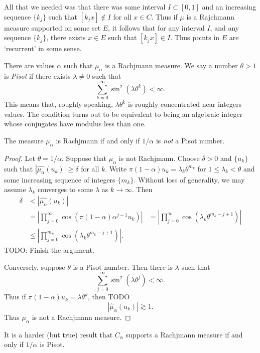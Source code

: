 All that we needed was that there was some interval $I \subset [0,1]$ and an increasing sequence $\{ k_j \}$ such that $[k_j x] \not \in I$ for all $x \in C$. Thus if $\mu$ is a Rajchmann measure supported on some set $E$, it follows that for any interval $I$, and any sequence $\{ k_j \}$, there exists $x \in E$ such that $[k_j x] \in I$. Thus points in $E$ are `recurrent' in some sense.

There are values $\alpha$ such that $\mu_\alpha$ is a Rachjmann measure. We say a number $\theta > 1$ is \emph{Pisot} if there exists $\lambda \neq 0$ such that
%
\[ \sum_{k = 0}^\infty \sin^2(\lambda \theta^k) < \infty. \]
%
This means that, roughly speaking, $\lambda \theta^k$ is roughly concentrated near integers values. The condition turns out to be equivalent to being an algebraic integer whose conjugates have modulus less than one.

\begin{theorem}
  The measure $\mu_\alpha$ is Rachjmann if and only if $1/\alpha$ is \emph{not} a Pisot number.
\end{theorem}
\begin{proof}
  Let $\theta = 1/\alpha$. Suppose that $\mu_\alpha$ is not Rachjmann. Choose $\delta > 0$ and $\{ u_k \}$ such that $|\widehat{\mu_\alpha}(u_k)| \geq \delta$ for all $k$. Write $\pi (1 - \alpha) u_k = \lambda_k \theta^{m_k}$ for $1 \leq \lambda_k < \theta$ and some increasing sequence of integers $\{ m_k \}$. Without loss of generality, we may assume $\lambda_k$ converges to some $\lambda$ as $k \to \infty$. Then
  \begin{align*}
    \delta &< |\widehat{\mu_\alpha}(u_k)|\\
    &= | \prod_{j = 0}^\infty \cos(\pi (1 - \alpha) \alpha^{j-1} u_k) |
    &= | \prod_{j = 0}^\infty \cos(\lambda_k \theta^{m_k - j + 1}) |\\
    &\leq | \prod_{j = 0}^{m_k} \cos(\lambda_k \theta^{m_k - j + 1}) |.
  \end{align*}
  TODO: Finish the argument.

  Conversely, suppose $\theta$ is a Pisot number. Then there is $\lambda$ such that
  \[ \sum_{j = 0}^\infty \sin^2(\lambda \theta^j) < \infty. \]
  Thus if $\pi (1 - \alpha) u_k = \lambda \theta^k$, then TODO
  \[ |\widehat{\mu}_\alpha(u_k)| \gtrsim 1. \]
  Thus $\mu_\alpha$ is not a Rachjmann measure.
\end{proof}

It is a harder (but true) result that $C_\alpha$ supports a Rachjmann measure if and only if $1/\alpha$ is Pisot.

